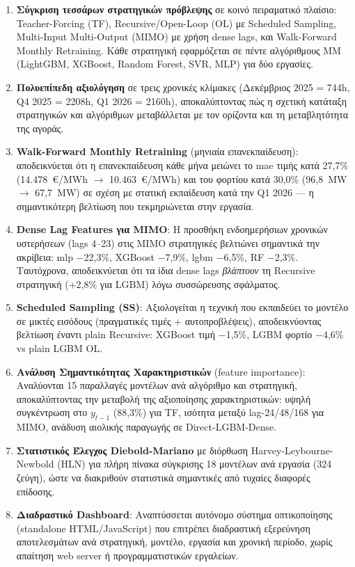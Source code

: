 \begin{enumerate}
    \item \textbf{Σύγκριση τεσσάρων στρατηγικών πρόβλεψης} σε κοινό πειραματικό
    πλαίσιο: Teacher-Forcing (TF), Recursive/Open-Loop (OL) με Scheduled Sampling,
    Multi-Input Multi-Output (MIMO) με χρήση dense lags, και Walk-Forward
    Monthly Retraining. Κάθε στρατηγική εφαρμόζεται σε πέντε αλγόριθμους ΜΜ
    (LightGBM, XGBoost, Random Forest, SVR, MLP) για δύο εργασίες.

    \item \textbf{Πολυεπίπεδη αξιολόγηση} σε τρεις χρονικές κλίμακες (Δεκέμβριος
    2025 = 744h, Q4 2025 = 2208h, Q1 2026 = 2160h), αποκαλύπτοντας πώς η σχετική
    κατάταξη στρατηγικών και αλγόριθμων μεταβάλλεται με τον ορίζοντα και τη
    μεταβλητότητα της αγοράς.

    \item \textbf{Walk-Forward Monthly Retraining} (μηνιαία επανεκπαίδευση):
    αποδεικνύεται ότι η επανεκπαίδευση κάθε μήνα μειώνει το \gls{mae} τιμής
    κατά 27,7\% (14.478~€/MWh $\to$ 10.463~€/MWh) και
    του φορτίου κατά 30,0\% (96,8~MW $\to$ 67,7~MW) σε σχέση με στατική εκπαίδευση
    κατά την Q1 2026 — η σημαντικότερη βελτίωση που τεκμηριώνεται στην εργασία.

    \item \textbf{Dense Lag Features για MIMO}: Η προσθήκη ενδοημερήσιων χρονικών
    υστερήσεων (lags 4--23) στις MIMO στρατηγικές βελτιώνει σημαντικά την
    ακρίβεια: \gls{mlp} −22,3\%, XGBoost −7,9\%, \gls{lgbm} −6,5\%, RF −2,3\%.
    Ταυτόχρονα, αποδεικνύεται ότι τα ίδια dense lags \textit{βλάπτουν} τη
    Recursive στρατηγική (+2,8\% για LGBM) λόγω συσσώρευσης σφάλματος.

    \item \textbf{Scheduled Sampling (SS)}: Αξιολογείται η τεχνική που εκπαιδεύει
    το μοντέλο σε μικτές εισόδους (πραγματικές τιμές + αυτοπροβλέψεις), αποδεικνύοντας
    βελτίωση έναντι plain Recursive: XGBoost τιμή −1,5\%, LGBM φορτίο −4,6\% vs
    plain LGBM OL.

    \item \textbf{Ανάλυση Σημαντικότητας Χαρακτηριστικών} (feature importance):
    Αναλύονται 15 παραλλαγές μοντέλων ανά αλγόριθμο και στρατηγική, αποκαλύπτοντας
    την μεταβολή της αξιοποίησης χαρακτηριστικών: υψηλή συγκέντρωση στο
    $y_{t-1}$ (88,3\%) για TF, ισότητα μεταξύ lag-24/48/168 για MIMO, ανάδυση
    αιολικής παραγωγής σε Direct-LGBM-Dense.

    \item \textbf{Στατιστικός Έλεγχος Diebold-Mariano} με διόρθωση
    Harvey-Leybourne-Newbold (HLN) για πλήρη πίνακα σύγκρισης 18 μοντέλων ανά
    εργασία (324 ζεύγη), ώστε να διακριθούν στατιστικά σημαντικές από
    τυχαίες διαφορές επίδοσης.

    \item \textbf{Διαδραστικό Dashboard}: Αναπτύσσεται αυτόνομο σύστημα
    οπτικοποίησης (standalone HTML/JavaScript) που επιτρέπει διαδραστική εξερεύνηση
    αποτελεσμάτων ανά στρατηγική, μοντέλο, εργασία και χρονική περίοδο, χωρίς
    απαίτηση web server ή προγραμματιστικών εργαλείων.
\end{enumerate}


